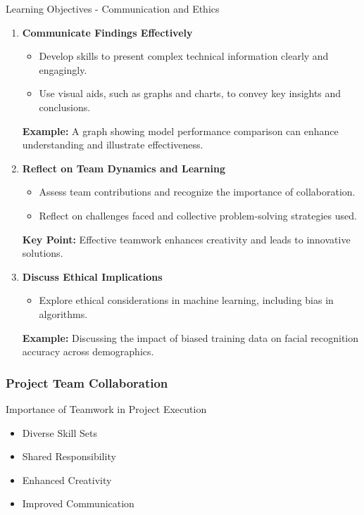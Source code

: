 \documentclass[aspectratio=169]{beamer}
\begin{document}
\begin{frame}[fragile]{Learning Objectives - Communication and Ethics}
    \begin{enumerate}[resume]
        \item \textbf{Communicate Findings Effectively}
            \begin{itemize}
                \item Develop skills to present complex technical information clearly and engagingly.
                \item Use visual aids, such as graphs and charts, to convey key insights and conclusions.
            \end{itemize}
            \textbf{Example:} A graph showing model performance comparison can enhance understanding and illustrate effectiveness.

        \item \textbf{Reflect on Team Dynamics and Learning}
            \begin{itemize}
                \item Assess team contributions and recognize the importance of collaboration.
                \item Reflect on challenges faced and collective problem-solving strategies used.
            \end{itemize}
            \textbf{Key Point:} Effective teamwork enhances creativity and leads to innovative solutions.

        \item \textbf{Discuss Ethical Implications}
            \begin{itemize}
                \item Explore ethical considerations in machine learning, including bias in algorithms.
            \end{itemize}
            \textbf{Example:} Discussing the impact of biased training data on facial recognition accuracy across demographics.
    \end{enumerate}
\end{frame}

\begin{frame}[fragile]
    \frametitle{Project Team Collaboration}
    \begin{block}{Importance of Teamwork in Project Execution}
        \begin{itemize}
            \item Diverse Skill Sets
            \item Shared Responsibility
            \item Enhanced Creativity
            \item Improved Communication
        \end{itemize}
    \end{block}
\end{frame}
\end{document}
